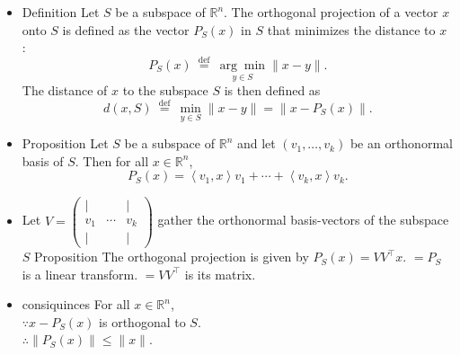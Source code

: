 \documentclass[12pt,twoside]{article}
\begin{document}
\begin{itemize}
\item Definition
Let $S$ be a subspace of $\mathbb{R}^n$. The orthogonal projection of a vector $x$ onto $S$ is defined as the vector $P_S(x)$ in $S$ that minimizes the distance to $x$ :
$$
P_S(x) \stackrel{\text { def }}{=} \underset{y \in S}{\arg \min }\|x-y\| .
$$
The distance of $x$ to the subspace $S$ is then defined as
$$
d(x, S) \stackrel{\text { def }}{=} \min _{y \in S}\|x-y\|=\left\|x-P_S(x)\right\| .
$$
\item Proposition
Let $S$ be a subspace of $\mathbb{R}^n$ and let $\left(v_1, \ldots, v_k\right)$ be an orthonormal basis of $S$. Then for all $x \in \mathbb{R}^n$,
$$
P_S(x)=\left\langle v_1, x\right\rangle v_1+\cdots+\left\langle v_k, x\right\rangle v_k .
$$
\item {} Let $V=\left(\begin{array}{ccc}\mid & & \mid \\ v_1 & \cdots & v_k \\ \mid & & \mid\end{array}\right)$ gather the orthonormal basis-vectors of the subspace $S$
Proposition
The orthogonal projection is given by $P_S(x)=V V^{\top} x$.
$=P_S$ is a linear transform.
$=V V^{\top}$ is its matrix.
\item consiquinces For all $x \in \mathbb{R}^n$,
\\$\because x-P_S(x)$ is orthogonal to $S$.\\
$\therefore\left\|P_S(x)\right\| \leq\|x\|$.

\end{itemize}
\end{document}
